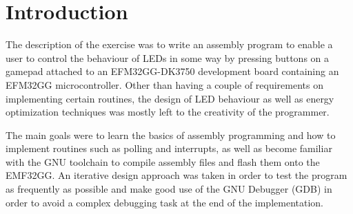 \section{Introduction}

The description of the exercise was to write an assembly program to enable a user to control the behaviour of LEDs in some way by pressing buttons on a gamepad attached to an EFM32GG-DK3750 development board containing an EFM32GG microcontroller. Other than having a couple of requirements on implementing certain routines, the design of LED behaviour as well as energy optimization techniques was mostly left to the creativity of the programmer.

The main goals were to learn the basics of assembly programming and how to implement routines such as polling and interrupts, as well as become familiar with the GNU toolchain to compile assembly files and flash them onto the EMF32GG. An iterative design approach was taken in order to test the program as frequently as possible and make good use of the GNU Debugger (GDB) in order to avoid a complex debugging task at the end of the implementation.